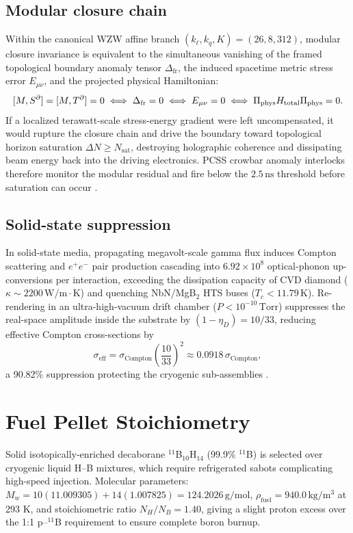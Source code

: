 \documentclass[10pt,journal,compsoc]{IEEEtran}
\newcommand{\ns}{\,\mathrm{ns}}
\begin{document}
\subsection{Modular closure chain}
Within the canonical WZW affine branch $(k_\ell, k_q, K) = (26,8,312)$,
modular closure invariance is equivalent to the simultaneous vanishing of
the framed topological boundary anomaly tensor $\Delta_{\mathrm{fr}}$, the
induced spacetime metric stress error $E_{\mu\nu}$, and the projected
physical Hamiltonian:
\begin{equation}\resizebox{\columnwidth}{!}{$\displaystyle
[M,S^{\partial}] = [M,T^{\partial}] = 0
\;\Longleftrightarrow\; \Delta_{\mathrm{fr}} = 0
\;\Longleftrightarrow\; E_{\mu\nu} = 0
\;\Longleftrightarrow\; \Pi_{\mathrm{phys}}H_{\mathrm{total}}
   \Pi_{\mathrm{phys}} = 0.
\label{eq:closure}
$}\end{equation}
If a localized terawatt-scale stress-energy gradient were left
uncompensated, it would rupture the closure chain and drive the boundary
toward topological horizon saturation $\Delta N \ge N_{\mathrm{sat}}$,
destroying holographic coherence and dissipating beam energy back into the
driving electronics. PCSS crowbar anomaly interlocks therefore monitor the
modular residual and fire below the $2.5\ns$ threshold before saturation
can occur \cite{trigatron2018,gaas_pulse2025,neuber2021}.

\subsection{Solid-state suppression}
In solid-state media, propagating megavolt-scale gamma flux induces
Compton scattering and $e^+e^-$ pair production cascading into
$6.92\times10^{8}$ optical-phonon up-conversions per interaction, exceeding
the dissipation capacity of CVD diamond
($\kappa \sim 2200\,\mathrm{W/m\cdot K}$) and quenching NbN/MgB$_2$ HTS
buses ($T_c < 11.79\,\mathrm{K}$). Re-rendering in an ultra-high-vacuum
drift chamber ($P < 10^{-10}\,\mathrm{Torr}$) suppresses the real-space
amplitude inside the substrate by $(1-\eta_D) = 10/33$, reducing effective
Compton cross-sections by
\begin{equation}
\sigma_{\mathrm{eff}} = \sigma_{\mathrm{Compton}}
  \left(\frac{10}{33}\right)^2 \approx 0.0918\,\sigma_{\mathrm{Compton}},
\end{equation}
a 90.82\% suppression protecting the cryogenic sub-assemblies
\cite{wbg2021}.

\section{Fuel Pellet Stoichiometry}
Solid isotopically-enriched decaborane $^{11}$B$_{10}$H$_{14}$ (99.9\%
$^{11}$B) is selected over cryogenic liquid H--B mixtures, which require
refrigerated sabots complicating high-speed injection. Molecular
parameters: $M_w = 10(11.009305) + 14(1.007825) = 124.2026\,\mathrm{g/mol}$,
$\rho_{\mathrm{fuel}} = 940.0\,\mathrm{kg/m^3}$ at 293 K, and stoichiometric
ratio $N_H/N_B = 1.40$, giving a slight proton excess over the 1:1
p--$^{11}$B requirement to ensure complete boron burnup.
\end{document}
